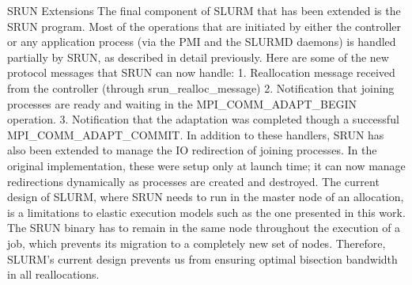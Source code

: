 SRUN Extensions
The final component of SLURM that has been extended is the SRUN program. Most of the operations that are initiated by either the controller or any application process (via the PMI and the SLURMD daemons) is handled partially by SRUN, as described in detail previously. Here are some of the new protocol messages that SRUN can now handle:
1. Reallocation message received from the controller (through srun{\_}realloc{\_}message)
2. Notification that joining processes are ready and waiting in the MPI{\_}COMM{\_}ADAPT{\_}BEGIN operation.
3. Notification that the adaptation was completed though a successful MPI{\_}COMM{\_}ADAPT{\_}COMMIT.
In addition to these handlers, SRUN has also been extended to manage the IO redirection of joining processes. In the original implementation, these were setup only at launch time; it can now manage redirections dynamically as processes are created and destroyed. The current design of SLURM, where SRUN needs to run in the master node of an allocation, is a limitations to elastic execution models such as the one presented in this work. The SRUN binary has to remain in the same node throughout the execution of a job, which prevents its migration to a completely new set of nodes. Therefore, SLURM's current design prevents us from ensuring optimal bisection bandwidth in all reallocations.

